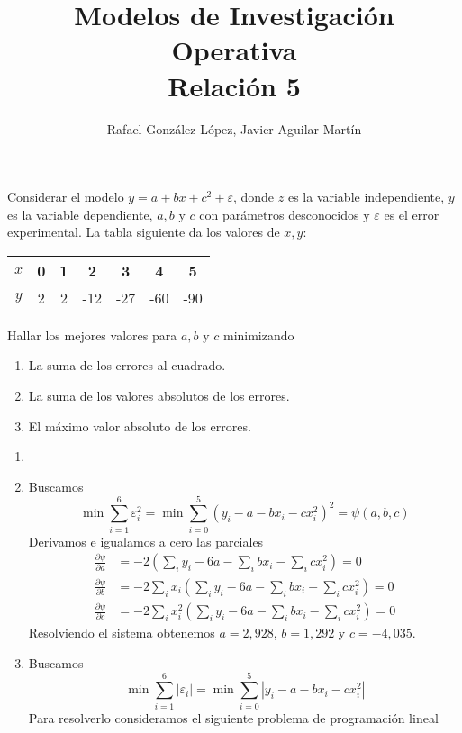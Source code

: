 \documentclass[twoside]{article}
\begin{document}
\title{Modelos de Investigación Operativa\\ Relación 5}
\author{Rafael González López, Javier Aguilar Martín}
\date{}
\maketitle

\begin{ejercicio}{1}Considerar el modelo $y=a+bx+c^2+\varepsilon$, donde $z$ es la variable independiente, $y$ es la variable dependiente, $a,b$ y $c$ con parámetros desconocidos y $\varepsilon$ es el error experimental. La tabla siguiente da los valores de $x,y$:
\begin{center}
\begin{tabular}{|c|c|c|c|c|c|c|}
\hline
$x$ & 0 &1 & 2 	& 3 	& 4 	& 5\\
\hline
$y$ & 2 &2 	& -12 	& -27 & -60 &-90\\
\hline
\end{tabular}
\end{center}
Hallar los mejores valores para $a,b$ y $c$ minimizando
\begin{enumerate}
\item La suma de los errores al cuadrado.
\item La suma de los valores absolutos de los errores.
\item El máximo valor absoluto de los errores.
\end{enumerate}
\begin{solucion}
\begin{enumerate}
\item[]
\item Buscamos 
$$
\min \sum_{i=1}^6 \varepsilon_i^2 = \min \sum_{i=0}^5(y_i -a-bx_i-c x_i^2)^2 = \psi(a,b,c)
$$
Derivamos e igualamos a cero las parciales
\begin{align*}
\frac{\partial \psi}{\partial a} &= -2\left(\sum_i y_i - 6a - \sum_i b x_i - \sum_i cx_i^2\right) = 0\\
\frac{\partial \psi}{\partial b} &= -2\sum_i x_i\left(\sum_i y_i - 6a - \sum_i b x_i - \sum_i cx_i^2\right) = 0\\
\frac{\partial \psi}{\partial c} &= -2\sum_i x_i^2\left(\sum_i y_i - 6a - \sum_i b x_i - \sum_i cx_i^2\right) = 0
\end{align*}
Resolviendo el sistema obtenemos $a=2,928$, $b=1,292$ y $c=-4,035$.
\item Buscamos
$$
\min \sum_{i=1}^6 |\varepsilon_i|= \min \sum_{i=0}^5|y_i -a-bx_i-c x_i^2| 
$$
Para resolverlo consideramos el siguiente problema de programación lineal

\end{enumerate}
\end{solucion}
\end{ejercicio}
\end{document}
